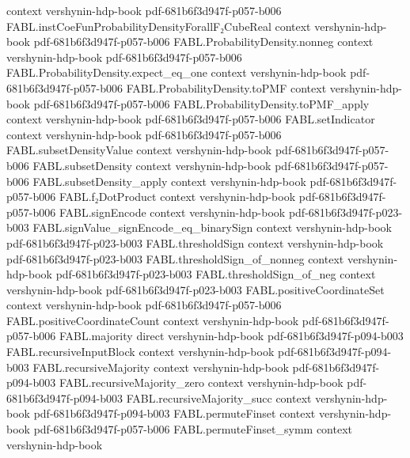 \begin{theorem}
  {context}
  {vershynin-hdp-book}
  {pdf-681b6f3d947f-p057-b006}
\proofstep
  {FABL.instCoeFunProbabilityDensityForallF₂CubeReal}
  {context}
  {vershynin-hdp-book}
  {pdf-681b6f3d947f-p057-b006}
\proofstep
  {FABL.ProbabilityDensity.nonneg}
  {context}
  {vershynin-hdp-book}
  {pdf-681b6f3d947f-p057-b006}
\proofstep
  {FABL.ProbabilityDensity.expect_eq_one}
  {context}
  {vershynin-hdp-book}
  {pdf-681b6f3d947f-p057-b006}
\proofstep
  {FABL.ProbabilityDensity.toPMF}
  {context}
  {vershynin-hdp-book}
  {pdf-681b6f3d947f-p057-b006}
\proofstep
  {FABL.ProbabilityDensity.toPMF_apply}
  {context}
  {vershynin-hdp-book}
  {pdf-681b6f3d947f-p057-b006}
\proofstep
  {FABL.setIndicator}
  {context}
  {vershynin-hdp-book}
  {pdf-681b6f3d947f-p057-b006}
\proofstep
  {FABL.subsetDensityValue}
  {context}
  {vershynin-hdp-book}
  {pdf-681b6f3d947f-p057-b006}
\proofstep
  {FABL.subsetDensity}
  {context}
  {vershynin-hdp-book}
  {pdf-681b6f3d947f-p057-b006}
\proofstep
  {FABL.subsetDensity_apply}
  {context}
  {vershynin-hdp-book}
  {pdf-681b6f3d947f-p057-b006}
\proofstep
  {FABL.f₂DotProduct}
  {context}
  {vershynin-hdp-book}
  {pdf-681b6f3d947f-p057-b006}
\proofstep
  {FABL.signEncode}
  {context}
  {vershynin-hdp-book}
  {pdf-681b6f3d947f-p023-b003}
\proofstep
  {FABL.signValue_signEncode_eq_binarySign}
  {context}
  {vershynin-hdp-book}
  {pdf-681b6f3d947f-p023-b003}
\proofstep
  {FABL.thresholdSign}
  {context}
  {vershynin-hdp-book}
  {pdf-681b6f3d947f-p023-b003}
\proofstep
  {FABL.thresholdSign_of_nonneg}
  {context}
  {vershynin-hdp-book}
  {pdf-681b6f3d947f-p023-b003}
\proofstep
  {FABL.thresholdSign_of_neg}
  {context}
  {vershynin-hdp-book}
  {pdf-681b6f3d947f-p023-b003}
\proofstep
  {FABL.positiveCoordinateSet}
  {context}
  {vershynin-hdp-book}
  {pdf-681b6f3d947f-p057-b006}
\proofstep
  {FABL.positiveCoordinateCount}
  {context}
  {vershynin-hdp-book}
  {pdf-681b6f3d947f-p057-b006}
\proofstep
  {FABL.majority}
  {direct}
  {vershynin-hdp-book}
  {pdf-681b6f3d947f-p094-b003}
\proofstep
  {FABL.recursiveInputBlock}
  {context}
  {vershynin-hdp-book}
  {pdf-681b6f3d947f-p094-b003}
\proofstep
  {FABL.recursiveMajority}
  {context}
  {vershynin-hdp-book}
  {pdf-681b6f3d947f-p094-b003}
\proofstep
  {FABL.recursiveMajority_zero}
  {context}
  {vershynin-hdp-book}
  {pdf-681b6f3d947f-p094-b003}
\proofstep
  {FABL.recursiveMajority_succ}
  {context}
  {vershynin-hdp-book}
  {pdf-681b6f3d947f-p094-b003}
\proofstep
  {FABL.permuteFinset}
  {context}
  {vershynin-hdp-book}
  {pdf-681b6f3d947f-p057-b006}
\proofstep
  {FABL.permuteFinset_symm}
  {context}
  {vershynin-hdp-book}

\end{theorem}
